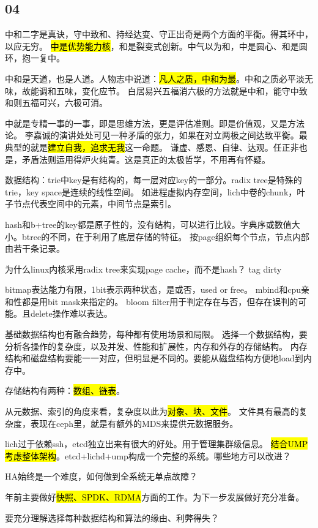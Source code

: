 \subsection{04}

中和二字是真诀，守中致和、持经达变、守正出奇是两个方面的平衡。得其环中，以应无穷。
\hl{中是优势能力核}，和是裂变式创新。中气以为和，中是圆心、和是圆环，抱一复中。

中和是天道，也是人道。人物志中说道：\hl{凡人之质，中和为最}。中和之质必平淡无味，故能调和五味，变化应节。
白居易兴五福消六极的方法就是中和，能守中致和则五福可兴，六极可消。

中就是专精一事的一事，即是思维方法，更是评估准则。即是价值观，又是方法论。
李嘉诚的演讲处处可见一种矛盾的张力，如果在对立两极之间达致平衡。最典型的就是\hl{建立自我，追求无我}这一命题。
谦虚、感恩、自律、达观。任正非也是，矛盾法则运用得炉火纯青。这是真正的太极哲学，不用再有怀疑。

数据结构：trie中key是有结构的，每一层对应key的一部分。radix tree是特殊的trie，key space是连续的线性空间。
如进程虚拟内存空间，lich中卷的chunk，叶子节点代表空间中的元素，中间节点是索引。

hash和b+tree的key都是原子性的，没有结构，可以进行比较。字典序或数值大小。btree的不同，在于利用了底层存储的特征。
按page组织每个节点，节点内部由若干条记录。

为什么linux内核采用radix tree来实现page cache，而不是hash？
tag dirty

bitmap表达能力有限，1bit表示两种状态，是或否，used or free。
mbind和cpu亲和性都是用bit mask来指定的。
bloom filter用于判定存在与否，但存在误判的可能。且delete操作难以表达。

基础数据结构也有融合趋势，每种都有使用场景和局限。
选择一个数据结构，要分析各操作的复杂度，以及并发、性能和扩展性，内存和外存的存储结构。
内存结构和磁盘结构要能一一对应，但明显是不同的。要能从磁盘结构方便地load到内存中。

存储结构有两种：\hl{数组、链表}。

从元数据、索引的角度来看，复杂度以此为\hl{对象、块、文件}。
文件具有最高的复杂度，表现在ceph里，就是有额外的MDS来提供元数据服务。

lich过于依赖ssh，etcd独立出来有很大的好处。用于管理集群级信息。
\hl{结合UMP考虑整体架构}。etcd+lichd+ump构成一个完整的系统。哪些地方可以改进？

HA始终是一个难度，如何做到全系统无单点故障？

年前主要做好\hl{快照、SPDK、RDMA}方面的工作。为下一步发展做好充分准备。

要充分理解选择每种数据结构和算法的缘由、利弊得失？

